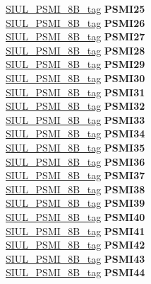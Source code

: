 \begin{DoxyCompactItemize}
\begin{tabbing}
\>\>\mbox{\hyperlink{unionSIUL__PSMI__8B__tag}{SIUL\_PSMI\_8B\_tag}} {\bfseries PSMI25}\\
\>\>\mbox{\hyperlink{unionSIUL__PSMI__8B__tag}{SIUL\_PSMI\_8B\_tag}} {\bfseries PSMI26}\\
\>\>\mbox{\hyperlink{unionSIUL__PSMI__8B__tag}{SIUL\_PSMI\_8B\_tag}} {\bfseries PSMI27}\\
\>\>\mbox{\hyperlink{unionSIUL__PSMI__8B__tag}{SIUL\_PSMI\_8B\_tag}} {\bfseries PSMI28}\\
\>\>\mbox{\hyperlink{unionSIUL__PSMI__8B__tag}{SIUL\_PSMI\_8B\_tag}} {\bfseries PSMI29}\\
\>\>\mbox{\hyperlink{unionSIUL__PSMI__8B__tag}{SIUL\_PSMI\_8B\_tag}} {\bfseries PSMI30}\\
\>\>\mbox{\hyperlink{unionSIUL__PSMI__8B__tag}{SIUL\_PSMI\_8B\_tag}} {\bfseries PSMI31}\\
\>\>\mbox{\hyperlink{unionSIUL__PSMI__8B__tag}{SIUL\_PSMI\_8B\_tag}} {\bfseries PSMI32}\\
\>\>\mbox{\hyperlink{unionSIUL__PSMI__8B__tag}{SIUL\_PSMI\_8B\_tag}} {\bfseries PSMI33}\\
\>\>\mbox{\hyperlink{unionSIUL__PSMI__8B__tag}{SIUL\_PSMI\_8B\_tag}} {\bfseries PSMI34}\\
\>\>\mbox{\hyperlink{unionSIUL__PSMI__8B__tag}{SIUL\_PSMI\_8B\_tag}} {\bfseries PSMI35}\\
\>\>\mbox{\hyperlink{unionSIUL__PSMI__8B__tag}{SIUL\_PSMI\_8B\_tag}} {\bfseries PSMI36}\\
\>\>\mbox{\hyperlink{unionSIUL__PSMI__8B__tag}{SIUL\_PSMI\_8B\_tag}} {\bfseries PSMI37}\\
\>\>\mbox{\hyperlink{unionSIUL__PSMI__8B__tag}{SIUL\_PSMI\_8B\_tag}} {\bfseries PSMI38}\\
\>\>\mbox{\hyperlink{unionSIUL__PSMI__8B__tag}{SIUL\_PSMI\_8B\_tag}} {\bfseries PSMI39}\\
\>\>\mbox{\hyperlink{unionSIUL__PSMI__8B__tag}{SIUL\_PSMI\_8B\_tag}} {\bfseries PSMI40}\\
\>\>\mbox{\hyperlink{unionSIUL__PSMI__8B__tag}{SIUL\_PSMI\_8B\_tag}} {\bfseries PSMI41}\\
\>\>\mbox{\hyperlink{unionSIUL__PSMI__8B__tag}{SIUL\_PSMI\_8B\_tag}} {\bfseries PSMI42}\\
\>\>\mbox{\hyperlink{unionSIUL__PSMI__8B__tag}{SIUL\_PSMI\_8B\_tag}} {\bfseries PSMI43}\\
\>\>\mbox{\hyperlink{unionSIUL__PSMI__8B__tag}{SIUL\_PSMI\_8B\_tag}} {\bfseries PSMI44}\\

\end{tabbing}
\end{DoxyCompactItemize}
